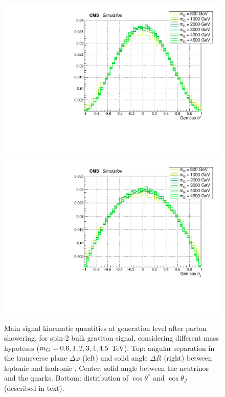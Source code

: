 \begin{figure}[!htb]
\begin{center}
     \includegraphics[width=.495\textwidth]{Gen_v9/XZZInv_g_CosThetaStar.pdf}%
     \includegraphics[width=.495\textwidth]{Gen_v9/XZZInv_g_CosThetaJ.pdf}%
   \end{center}
   \caption{Main signal kinematic quantities at generation level after parton showering, for spin-2 bulk graviton signal, considering different mass hypoteses ($m_{G} = 0.6, 1, 2, 3, 4, 4.5$ TeV). Top: angular separation in the transverse plane $\Delta \varphi$ (left) and solid angle $\Delta R$ (right) between leptonic \Z and hadronic \Z. Center: solid angle between the neutrinos and the quarks. Bottom: distribution of $\cos{\theta}^{*}$ and $\cos{\theta}_{J}$ (described in text).}
   \label{fig:genGravSignal3}
 \end{figure}

